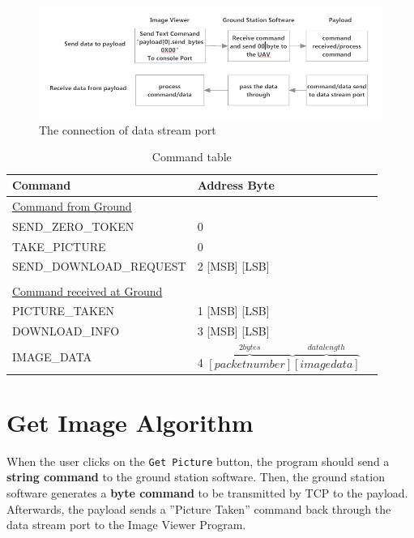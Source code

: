 \begin{figure}[H]
\begin{center}
\includegraphics[scale=0.6]{figures/GCS_Payload_communication.png} 
\caption{The connection of data stream port\label{GCS_Payload_comm}}
\end{center}
\end{figure}

\begin{table}[H]

\begin{center}
\begin{tabular}{l l @{.} l}
 Command&
\multicolumn{2}{l}{Address Byte } \\

\hline
\underline{Command from Ground} & \\
SEND\_ZERO\_TOKEN & 0 \\
TAKE\_PICTURE & 0 \\
SEND\_DOWNLOAD\_REQUEST & 2 [MSB] [LSB]  \\
\\
\underline{Command received at Ground}\\
PICTURE\_TAKEN & 1 [MSB] [LSB]\\
DOWNLOAD\_INFO & 3 [MSB] [LSB]\\
IMAGE\_DATA & 4 $\overbrace{ [packet number]}^{2bytes} \overbrace{[image data]}^{data length}$ \\
\end{tabular}
\caption{Command table\label{command_table}}
\end{center}
\end{table}

\section{Get Image Algorithm}
\label{get image algorithm}
When the user clicks on the \texttt{Get Picture} button, the program should send a \textbf{string command} to the ground station software.
Then, the ground station software generates a \textbf{byte command} to be transmitted by TCP to the payload. 
Afterwards, the payload sends a ''Picture Taken'' command back through the data stream port to the Image Viewer Program.

